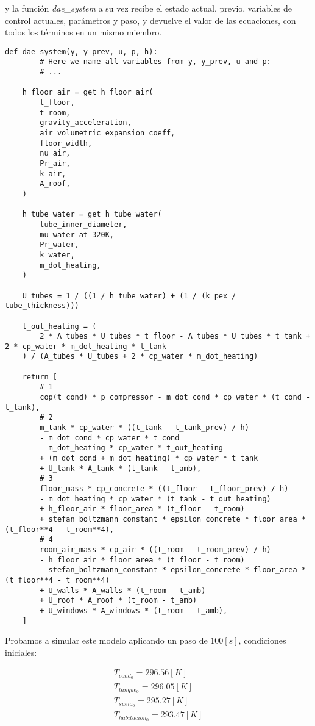 y la función \textit{dae\_system} a su vez recibe el estado actual, previo,
variables de control actuales, parámetros y paso, y devuelve el valor de las
ecuaciones, con todos los términos en un mismo miembro.


\begin{verbatim}
def dae_system(y, y_prev, u, p, h):
		# Here we name all variables from y, y_prev, u and p:
		# ...

    h_floor_air = get_h_floor_air(
        t_floor,
        t_room,
        gravity_acceleration,
        air_volumetric_expansion_coeff,
        floor_width,
        nu_air,
        Pr_air,
        k_air,
        A_roof,
    )

    h_tube_water = get_h_tube_water(
        tube_inner_diameter,
        mu_water_at_320K,
        Pr_water,
        k_water,
        m_dot_heating,
    )

    U_tubes = 1 / ((1 / h_tube_water) + (1 / (k_pex / tube_thickness)))

    t_out_heating = (
        2 * A_tubes * U_tubes * t_floor - A_tubes * U_tubes * t_tank + 2 * cp_water * m_dot_heating * t_tank
    ) / (A_tubes * U_tubes + 2 * cp_water * m_dot_heating)

    return [
        # 1
        cop(t_cond) * p_compressor - m_dot_cond * cp_water * (t_cond - t_tank),
        # 2
        m_tank * cp_water * ((t_tank - t_tank_prev) / h)
        - m_dot_cond * cp_water * t_cond
        - m_dot_heating * cp_water * t_out_heating
        + (m_dot_cond + m_dot_heating) * cp_water * t_tank
        + U_tank * A_tank * (t_tank - t_amb),
        # 3
        floor_mass * cp_concrete * ((t_floor - t_floor_prev) / h)
        - m_dot_heating * cp_water * (t_tank - t_out_heating)
        + h_floor_air * floor_area * (t_floor - t_room)
        + stefan_boltzmann_constant * epsilon_concrete * floor_area * (t_floor**4 - t_room**4),
        # 4
        room_air_mass * cp_air * ((t_room - t_room_prev) / h)
        - h_floor_air * floor_area * (t_floor - t_room)
        - stefan_boltzmann_constant * epsilon_concrete * floor_area * (t_floor**4 - t_room**4)
        + U_walls * A_walls * (t_room - t_amb)
        + U_roof * A_roof * (t_room - t_amb)
        + U_windows * A_windows * (t_room - t_amb),
    ]
\end{verbatim}

Probamos a simular este modelo aplicando un paso de $100[s]$, condiciones iniciales:

\begin{align}
	T_{cond_0} = 296.56[K]       \\
	T_{tanque_0} = 296.05[K]     \\
	T_{suelo_0} = 295.27[K]      \\
	T_{habitacion_0} = 293.47[K] \\
\end{align}

